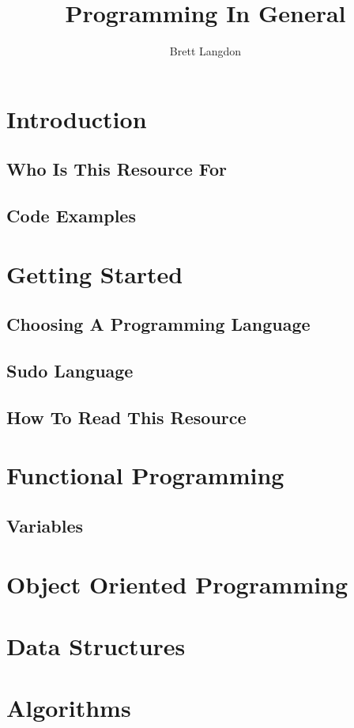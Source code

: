 \documentclass[10pt,a4paper,titlepage]{book}
\author{Brett Langdon}
\title{Programming In General}
\begin{document}
\maketitle
\tableofcontents

\chapter{Introduction}


\section{Who Is This Resource For}


\section{Code Examples}


\chapter{Getting Started}


\section{Choosing A Programming Language}


\section{Sudo Language}


\section{How To Read This Resource}


\chapter{Functional Programming}


\section{Variables}


\chapter{Object Oriented Programming}


\chapter{Data Structures}


\chapter{Algorithms}

\end{document}
